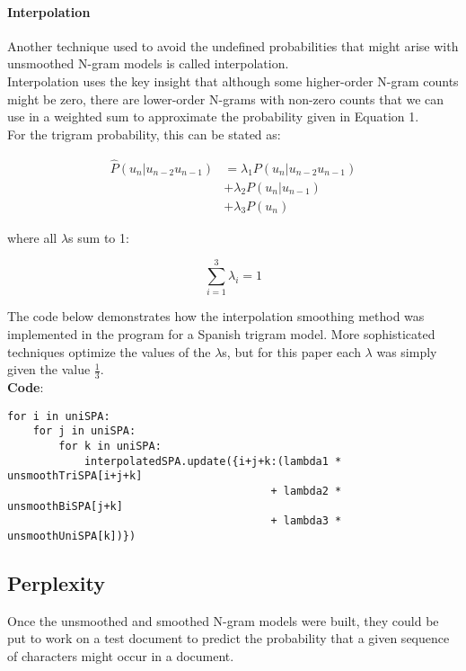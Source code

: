 \documentclass[a4,10pt]{article}
\begin{document}
\paragraph{Interpolation}

Another technique used to avoid the undefined probabilities that might arise with unsmoothed N-gram models is called interpolation. \\

Interpolation uses the key insight that although some higher-order N-gram counts might be zero, there are lower-order N-grams with non-zero counts that we can use in a weighted sum to approximate the probability given in Equation 1. \\

For the trigram probability, this can be stated as: 

\begin{align}
\hat{P} (u_n|u_{n-2}u_{n-1}) &= \lambda_1 P(u_n|u_{n-2}u_{n-1}) \nonumber \\
 &+ \lambda_2  P(u_n|u_{n-1}) \nonumber \\
 &+\lambda_3 P(u_n)
\end{align}

where all $\lambda$s sum to 1: 

\begin{equation} \sum_{i=1}^{3} \lambda_i = 1 \nonumber \end{equation}

The code below demonstrates how the interpolation smoothing method was implemented in the program for a Spanish trigram model. More sophisticated techniques optimize the values of the $\lambda$s, but for this paper each $\lambda$ was simply given the value $\frac{1}{3}$. \\

\textbf{Code}: 

\begin{verbatim}
for i in uniSPA:
    for j in uniSPA:
        for k in uniSPA:
            interpolatedSPA.update({i+j+k:(lambda1 * unsmoothTriSPA[i+j+k] 
                                         + lambda2 * unsmoothBiSPA[j+k] 
                                         + lambda3 * unsmoothUniSPA[k])})
\end{verbatim}

\subsection{Perplexity}

Once the unsmoothed and smoothed N-gram models were built, they could be put to work on a test document to predict the probability that a given sequence of characters might occur in a document. \\
\end{document}
